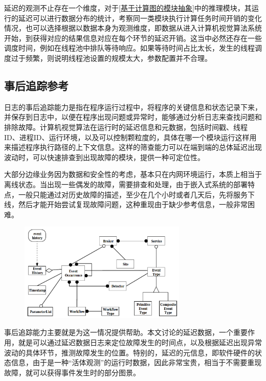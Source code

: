 \documentclass[master,anonymous]{shtthesis}
\begin{document}
延迟的观测不止存在一个维度，对于\ref{基于计算图的模块抽象}中的推理模块，其运行的延迟可以进行数据分布的统计，考察同一类模块执行计算任务时间开销的变化情况，也可以选择根据以数据本身为观测维度，即数据从进入计算机视觉算法系统开始，到获得对应的结果信息对应在每个环节的延迟开销。这当中必然还存在一些调度时间，例如在线程池中排队等待响应。如果等待时间占比太长，发生的线程调度过于频繁，则说明线程池设置的规模太大，参数配置并不合理。

\subsection{事后追踪参考}\label{事后追踪参考}
日志的事后追踪能力是指在程序运行过程中，将程序的关键信息和状态记录下来，并保存到日志中，以便在程序出现问题或异常时，能够通过分析日志来查找问题和排除故障。计算机视觉算法在运行时的延迟信息和元数据，包括时间戳、线程ID、进程ID、运行环境，以及可以控制颗粒度的，具体在哪一个模块运行这样用来描述程序执行路径的上下文信息。这样的筛查能力可以在端到端的总体延迟出现波动时，可以快速排查到出现故障的模块，提供一种可定位性。

大部分边缘业务因为数据和安全性的考虑，基本只在内网环境运行，本质上相当于离线状态。当出现一些偶发的故障，需要排查和处理，由于嵌入式系统的部署特点，一般只能通过对历史故障的描述，至少在几个小时或者几天后，先将服务下线，然后才能开始尝试复现故障问题，这种重现由于缺少参考信息，一般非常困难。

\begin{figure}[htbp]
	\centering
	\includegraphics[width=8cm]{img/eve.png}
	\label{一种日志事件跟踪的设计方法}
\end{figure}

事后追踪能力主要就是为这一情况提供帮助。本文讨论的延迟数据，一个重要作用，就是可以通过延迟数据日志来定位故障发生的时间点，以及根据延迟出现异常波动的具体环节，推测故障发生的位置\cite{geppert1997logging}。特别的，延迟的元信息，即软件硬件的状态信息，由于是一种“活体观测”的运行时数据，因此非常宝贵，相当于不需要重现故障，就可以获得事件发生时的部分图景。
\end{document}

